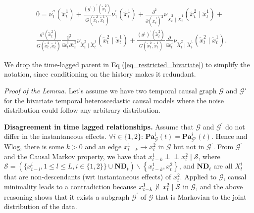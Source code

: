 \begin{mybox}
\begin{lemma}
\begin{equation}
\begin{aligned}
& 0=\nu_1^{\prime \prime}(\tilde{x}_t^1)+\frac{(g^1)^{\prime}(\tilde{x}_t^2)}{G(\tilde{x}_t^2, \tilde{x}_t^1)} \nu_1^{\prime}(\tilde{x}_t^1)+\frac{\partial^2}{\partial (\tilde{x}_t^1)^2} \nu_{\tilde{X}_t^2 \mid \tilde{X}_t^1}(\tilde{x}_t^2 \mid \tilde{x}_t^1)+ \\
& \frac{g^1(\tilde{x}_t^2)}{G(\tilde{x}_t^2, \tilde{x}_t^1)} \frac{\partial^2}{\partial \tilde{x}_t^1 \partial \tilde{x}_t^2} \nu_{\tilde{X}_t^2 \mid \tilde{X}_t^1}(\tilde{x}_t^2 \mid \tilde{x}_t^1)+\frac{(g^1)^{\prime}(\tilde{x}_t^2)}{G(\tilde{x}_t^2, \tilde{x}_t^1)} \frac{\partial}{\partial \tilde{x}_t^1} \nu_{\tilde{X}_t^2 \mid \tilde{X}_t^1}(\tilde{x}_t^2 \mid \tilde{x}_t^1) .
\end{aligned}
\label{PDE_condition}  
\end{equation}

\label{TRHNM_lemma}
\end{lemma} \end{mybox}
We drop the time-lagged parent in Eq (\ref{eq_restricted_bivariate}) to simplify the notation, since conditioning on the history makes it redundant.

\textit{Proof of the Lemma. } 
Let's assume we have two temporal causal graph $\mathcal{G}$ and $ \mathcal{G}'$ for the bivariate temporal heteroscedastic causal models where the noise distribution could follow any arbitrary distribution. 

\textbf{Disagreement in time lagged relationships. } Assume that $\mathcal{G}$ and $\mathcal{G}^{\prime}$ do not differ in the instantaneous effects. $\forall i \in \{1,2\}$: $\mathbf{P a}_{\mathcal{G}}^i(t) = \mathbf{P a}_{\mathcal{G}'}^i(t)$. 
Hence and Wlog, there is some $k>0$ and an edge $x_{t-k}^1 \rightarrow x_t^2$ in $\mathcal{G}$ but not in $\mathcal{G}^{\prime}$. From $\mathcal{G}^{\prime}$ and the Causal Markov property, we have that $x_{t-k}^1 \perp\!\!\!\perp x_t^2 \mid \mathcal{S}$, where $\mathcal{S}=(\{x_{t-l}^i, 1 \leq l \leq L,  i \in \{1,2\}\} \cup \mathbf{N D}_t) \backslash\left\{x_{t-k}^1, x_t^2\right\}$, and $\mathbf{N D}_t$ are all $X_t^i$ that are non-descendants (wrt instantaneous effects) of $x_t^2$. Applied to $\mathcal{G}$, causal minimality leads to a contradiction because $x_{t-k}^1 \not\!\perp\!\!\!\perp x_t^2 \mid \mathcal{S}$ in $\mathcal{G}$, and the above reasoning shows that it exists a subgraph $\mathcal{G}^{\prime}$ of $\mathcal{G}$ that is Markovian to the joint distribution of the data.

